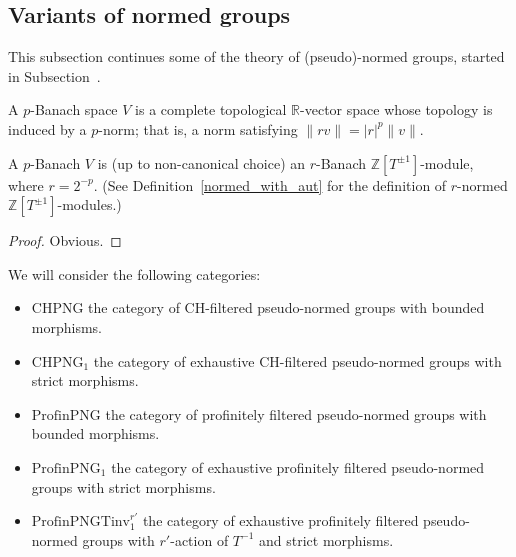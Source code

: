 \subsection{Variants of normed groups}
\label{sec:normed_groups2}

This subsection continues some of the theory of (pseudo)-normed groups,
started in Subsection~\label{sec:normed_groups}.

\begin{definition}
  \label{p-banach}
  \leanok
  A $p$-Banach space $V$ is a complete topological $\mathbb R$-vector space
  whose topology is induced by a $p$-norm;
  that is, a norm satisfying $\|rv\| = |r|^p\|v\|$.
\end{definition}

\begin{lemma}
  \label{p-banach-r-normed}
   A $p$-Banach $V$ is (up to non-canonical choice) an $r$-Banach $\mathbb Z[T^{\pm 1}]$-module, where $r=2^{-p}$.
   (See Definition~\ref{normed_with_aut} for the definition of $r$-normed $\mathbb Z[T^{\pm 1}]$-modules.)
\end{lemma}

\begin{proof}
  Obvious.
\end{proof}

\begin{definition}
  \label{png-cats}
  \leanok
  We will consider the following categories:
  \begin{itemize}
    \item $\text{CHPNG}$ the category of CH-filtered pseudo-normed groups with bounded morphisms.
    \item $\text{CHPNG}_1$ the category of exhaustive CH-filtered pseudo-normed groups with strict morphisms.
    \item $\text{ProfinPNG}$ the category of profinitely filtered pseudo-normed groups with bounded morphisms.
    \item $\text{ProfinPNG}_1$ the category of exhaustive profinitely filtered pseudo-normed groups with strict morphisms.
    \item $\text{ProfinPNGTinv}_1^{r'}$ the category of exhaustive profinitely filtered pseudo-normed groups with $r'$-action of $T^{-1}$ and strict morphisms.
  \end{itemize}
\end{definition}

